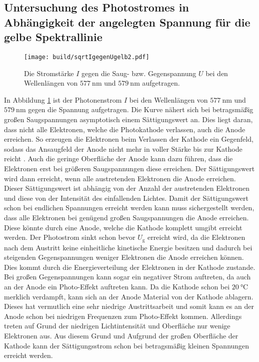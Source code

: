 \subsection{Untersuchung des Photostromes in Abhängigkeit der angelegten Spannung für die gelbe Spektrallinie}
\begin{figure}
	\centering
	\caption{Die Stromstärke $I$ gegen die Saug- bzw. Gegenspannung $U$ bei den Wellenlängen von $\SI{577}{\nano\meter}$ und $ \SI{579}{\nano\meter}$ aufgetragen.}
	\texttt{[image: build/sqrtIgegenUgelb2.pdf]}
	\label{fig:Graphgelb2}
\end{figure}
In Abbildung \ref{fig:Graphgelb2} ist der Photonenstrom $I$ bei den Wellenlängen von
$\SI{577}{\nano\meter}$ und $\SI{579}{\nano\meter}$ gegen die Spannung aufgetragen.
Die Kurve nähert sich bei betragsmäßig großen Saugspannungen asymptotisch
  einem Sättigungswert an. Dies liegt daran, dass nicht alle Elektronen, welche die Photokathode verlassen, auch die Anode erreichen. So erzeugen die Elektronen beim Verlassen der Kathode ein Gegenfeld, sodass das Ansaugfeld der Anode nicht mehr in voller Stärke bis zur Kathode reicht \cite{V504}. Auch die geringe Oberfläche der Anode kann dazu führen, dass die Elektronen erst bei größeren Saugspannungen diese erreichen. Der Sättigungswert wird dann erreicht, wenn alle austretenden Elektronen die Anode erreichen. Dieser Sättigungswert ist abhängig von der Anzahl der austretenden Elektronen und diese von der Intensität des einfallenden Lichtes. Damit der Sättigungswert schon bei endlichen Spannungen erreicht werden kann muss sichergestellt werden, dass alle Elektronen bei genügend großen Saugspannungen die Anode erreichen. Diese könnte durch eine Anode, welche die Kathode komplett umgibt erreicht werden. Der Photostrom sinkt schon bevor $U_\text{g}$ erreicht wird, da die Elektronen nach dem Austritt keine einheitliche kinetische Energie besitzen und dadurch bei steigenden Gegenspannungen weniger Elektronen die Anode erreichen können. Dies kommt durch die Energieverteilung der Elektronen in der Kathode zustande. Bei großen Gegenspannungen kann sogar ein negativer Strom auftreten, da auch an der Anode ein Photo-Effekt auftreten kann. Da die Kathode schon bei $\SI{20}{\degreeCelsius}$ \cite{V500} merklich verdampft, kann sich an der Anode Material von der Kathode ablagern. Dieses hat vermutlich eine sehr niedrige Austrittsarbeit und somit kann es an der Anode schon bei niedrigen Frequenzen zum Photo-Effekt kommen. Allerdings treten auf Grund der niedrigen Lichtintensität und Oberfläche nur wenige Elektronen aus. Aus diesem Grund und Aufgrund der großen Oberfläche der Kathode kann der Sättigungsstrom schon bei betragsmäßig kleinen Spannungen erreicht werden.

